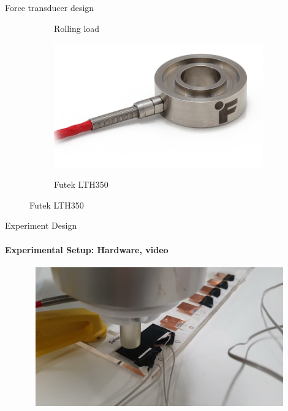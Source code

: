 \documentclass[aspectratio=169]{beamer}
\begin{document}
\begin{frame}[t]{Force transducer design}
\begin{figure}[H]
\begin{subfigure}[t]{0.29\textwidth}
            \caption*{Rolling load}
            \label{fig:rolling_load}
        \end{subfigure}
        \begin{subfigure}[t]{0.29\textwidth}
            \centering\includegraphics[width=0.99\textwidth]{LTH350-DONUT-LOAD-CELL-1.png}\\
            \caption*{Futek LTH350}
            \label{fig:futek}
        \end{subfigure}
    \end{figure}
\end{frame}

\begin{frame}[t]{Experiment Design}
    \framesubtitle{Experimental Setup: Hardware, video}
    \vspace{-15pt}
    \begin{figure}[H]
        \href{run:./videos/exp_stand_video.mp4}{
            \centering\includegraphics[height=6cm,width=1\textwidth,keepaspectratio]{exp_stand_video_preview.jpg}}
    \end{figure}
\end{frame}
\end{document}
